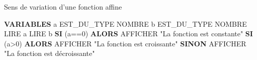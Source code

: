\documentclass[10pt,a4paper]{article}
\newenvironment{cadrecode}{%
\def\FrameCommand{{\color{fond}\vrule width 5pt}\fcolorbox{fond}{white}}%
\MakeFramed {\hsize \linewidth \advance\hsize-\width \FrameRestore}\begin{footnotesize}}%
{\end{footnotesize}\endMakeFramed}
\def\Ligne{\State\unskip\the\therules}%
\def\Variables{\Ligne \textcolor{bloccolor}{\textbf{VARIABLES}}}
\def\Si#1{\Ligne \textcolor{sicolor}{\textbf{SI}} #1 \textcolor{sicolor}{\textbf{ALORS}}}%
\def\Sinon{\Ligne \textcolor{sicolor}{\textbf{SINON}}}%
\newenvironment{algobox}%
{%
\begin{ttfamily}
\begin{algorithmic}[1]
\begin{cadrecode}
}
{%
\end{cadrecode}
\end{algorithmic}
\end{ttfamily}
}
\begin{document}
Sens de variation d'une fonction affine
\begin{algobox}
\Variables
\Ligne a EST\_DU\_TYPE NOMBRE
\Ligne b EST\_DU\_TYPE NOMBRE
\DebutAlgo
\Ligne LIRE a
\Ligne LIRE b
\Si{(a==0)}
\DebutSi
\Ligne AFFICHER "La fonction est constante"
\FinSi
\Si{(a>0)}
\DebutSi
\Ligne AFFICHER "La fonction est croissante"
\FinSi
\Sinon
\DebutSinon
\Ligne AFFICHER "La fonction est décroissante"
\FinSinon
\FinAlgo

\end{algobox}
\end{document}
